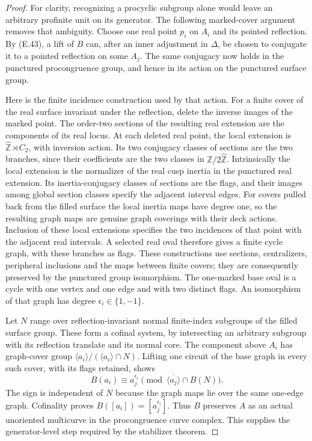 \begin{proof}
For clarity, recognizing a procyclic subgroup alone would
leave an arbitrary profinite unit on its generator.  The
following marked-cover argument removes that ambiguity.
Choose one real point $p_i$ on $A_i$ and its pointed
reflection.  By (E.43), a lift of $B$ can, after an inner
adjustment in $\Delta$, be chosen to conjugate it to a
pointed reflection on some $A_j$.  The same conjugacy now
holds in the punctured procongruence group, and hence in its
action on the punctured surface group.

Here is the finite incidence construction used by that action.
For a finite cover of the real surface invariant under the
reflection, delete the inverse images of the marked point.
The order-two sections of the resulting real extension are
the components of its real locus.  At each deleted real point,
the local extension is
$\widehat{\mathbb Z}\rtimes C_2$, with inversion action.
Its two conjugacy classes of sections are the two branches,
since their coefficients are the two classes in
$\widehat{\mathbb Z}/2\widehat{\mathbb Z}$.  Intrinsically the
local extension is the normalizer of the real cusp inertia
in the punctured real extension.  Its inertia-conjugacy
classes of sections are the flags, and their images among
global section classes specify the adjacent interval edges.
For covers pulled back from the filled surface the local
inertia maps have degree one, so the resulting graph maps
are genuine graph coverings with their deck actions.  Inclusion of
these local extensions specifies the two incidences of that
point with the adjacent real intervals.  A selected real oval
therefore gives a finite cycle graph, with these branches as
flags.  These constructions use sections, centralizers,
peripheral inclusions and the maps between finite covers;
they are consequently preserved by the punctured group
isomorphism.  The one-marked base oval is a cycle with one
vertex and one edge and with two distinct flags.  An
isomorphism of that graph has degree
$\epsilon_i\in\{1,-1\}$.

Let $N$ range over reflection-invariant normal finite-index
subgroups of the filled surface group.  These form a cofinal
system, by intersecting an arbitrary subgroup with its
reflection translate and its normal core.  The component
above $A_i$ has graph-cover group
$\langle a_i\rangle/(\langle a_i\rangle\cap N)$.
Lifting one circuit of the base graph in every such cover,
with its flags retained, shows
\[
 B(a_i)\equiv a_j^{\epsilon_i}
             \pmod{\overline{\langle a_j\rangle}\cap B(N)}.
\]
The sign is independent of $N$ because the graph maps lie
over the same one-edge graph.  Cofinality proves
$B([a_i])=[a_j^{\epsilon_i}]$.  Thus $B$ preserves $A$ as
an actual unoriented multicurve in the procongruence curve
complex.  This supplies the generator-level step required
by the stabilizer theorem.


\end{proof}
